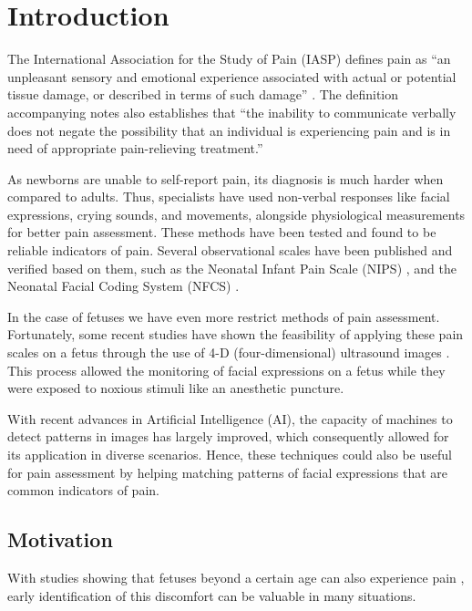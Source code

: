 \chapter{Introduction}

The International Association for the Study of Pain (IASP) defines pain as ``an unpleasant sensory and emotional experience associated with actual or potential tissue damage, or described in terms of such damage'' \citep{merskey1994classification}. The definition accompanying notes also establishes that ``the inability to communicate verbally does not negate the possibility that an individual is experiencing pain and is in need of appropriate pain-relieving treatment.''

As newborns are unable to self-report pain, its diagnosis is much harder when compared to adults. Thus, specialists have used non-verbal responses like facial expressions, crying sounds, and movements, alongside physiological measurements for better pain assessment. These methods have been tested and found to be reliable indicators of pain. Several observational scales have been published and verified based on them, such as the Neonatal Infant Pain Scale (NIPS) \citep{Lawrence1993}, and the Neonatal Facial Coding System (NFCS) \citep{Grunau1998}.

In the case of fetuses we have even more restrict methods of pain assessment. Fortunately, some recent studies have shown the feasibility of applying these pain scales on a fetus through the use of 4-D (four-dimensional) ultrasound images \citep{bernardes2018feasibility}. This process allowed the monitoring of facial expressions on a fetus while they were exposed to noxious stimuli like an anesthetic puncture.

With recent advances in Artificial Intelligence (AI), the capacity of machines to detect patterns in images has largely improved, which consequently allowed for its application in diverse scenarios. Hence, these techniques could also be useful for pain assessment by helping matching patterns of facial expressions that are common indicators of pain.

\section{Motivation}

With studies showing that fetuses beyond a certain age can also experience pain \citep{Derbyshire2006, Derbyshire2020}, early identification of this discomfort can be valuable in many situations. 

